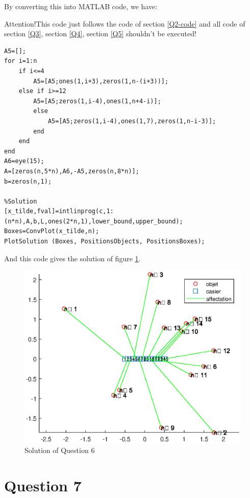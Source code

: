 \documentclass{CSArticle}[english]
\begin{document}
By converting this into MATLAB code, we have:
\par {\color{red}Attention!This code just follows the code of section \ref{Q2-code} and all code of section \ref{Q3}, section \ref{Q4}, section \ref{Q5} shouldn't be executed!}
\begin{lstlisting}[style=MATLAB]
%Definition of A
A5=[];
for i=1:n
    if i<=4
        A5=[A5;ones(1,i+3),zeros(1,n-(i+3))];
    else if i>=12
        A5=[A5;zeros(1,i-4),ones(1,n+4-i)];
        else
            A5=[A5;zeros(1,i-4),ones(1,7),zeros(1,n-i-3)];
        end
    end
end
A6=eye(15);
A=[zeros(n,5*n),A6,-A5,zeros(n,8*n)];
b=zeros(n,1);

%Solution
[x_tilde,fval]=intlinprog(c,1:(n*n),A,b,L,ones(2*n,1),lower_bound,upper_bound);
Boxes=ConvPlot(x_tilde,n);
PlotSolution (Boxes, PositionsObjects, PositionsBoxes);
\end{lstlisting}
And this code gives the solution of figure \ref{fig:Q6}.
\begin{figure}[ht]
\centering
\includegraphics[scale=0.6]{figure/Q6.eps}
\caption{Solution of Question 6}
\label{fig:Q6}
\end{figure}


\section{Question 7}
\label{Q7}
\end{document}

